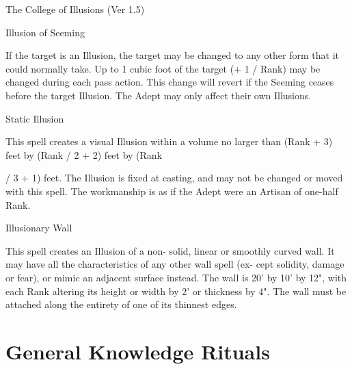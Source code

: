 \begin{Chapter}{The College of Illusions (Ver 1.5)}
\begin{spell}[G-6]{Illusion of Seeming }
\begin{effects}
If  the  target  is  an  Illusion,  the  target  may  be 
changed  to  any  other  form  that  it  could  normally 
take. Up to 1 cubic foot of the target (+ 1 / Rank) 
may  be  changed  during  each  pass  action.  This 
change will revert if the Seeming ceases before the 
target  Illusion.  The  Adept  may  only  affect  their 
own Illusions. 

\end{effects}
\end{spell}

\begin{spell}[G-7]{Static Illusion }

\begin{effects}
This spell creates a visual Illusion within a 
volume no larger than (Rank + 3) feet by (Rank / 2 
+ 2) feet by (Rank 

/  3  +  1)  feet.  The  Illusion  is  fixed  at  casting,  and 
may not be changed or moved with this spell. The 
workmanship is as if the Adept were an Artisan of 
one-half Rank. 

\end{effects}
\end{spell}

\begin{spell}[G-8]{Illusionary Wall }

\begin{effects}
 This  spell  creates  an  Illusion  of  a  non-
solid,  linear  or  smoothly  curved  wall.  It  may  have 
all  the  characteristics  of  any  other  wall  spell  (ex-
cept solidity, damage or fear), or mimic an adjacent 
surface instead. The wall is 20’ by 10’ by 12", with 
each  Rank  altering  its  height  or  width  by  2’  or 
thickness  by  4".  The  wall  must  be  attached  along 
the entirety of one of its thinnest edges. 

\end{effects}
\end{spell}

\section{General Knowledge Rituals}


\end{Chapter}
